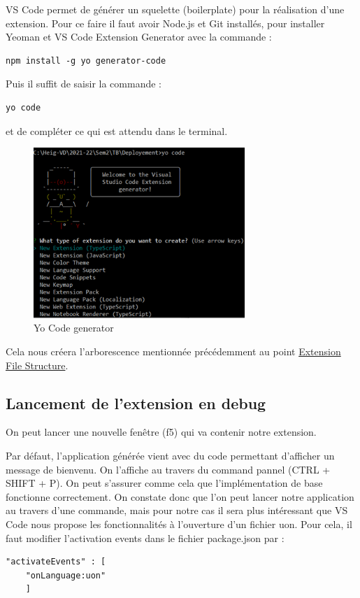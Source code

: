 \documentclass[
    iict, %
    il, %
]{heig-tb}
\begin{document}
VS Code permet de générer un squelette (boilerplate) pour la réalisation d'une extension. Pour ce faire il faut avoir Node.js et Git installés, pour installer Yeoman et VS Code Extension Generator avec la commande :


\begin{lstlisting}[frame=single,caption={generator-code},label={generator-code}]
npm install -g yo generator-code
\end{lstlisting}

Puis il suffit de saisir la commande :

\begin{lstlisting}[frame=single]
yo code
\end{lstlisting}

et de compléter ce qui est attendu dans le terminal.

\begin{figure}[!h]
    \begin{center}
        \includegraphics[width=8cm]{assets/figures/yo-code.png}
    \end{center}
    \caption[Yo Code generator]{\label{yo-code}Yo Code generator}
\end{figure}

Cela nous créera l'arborescence mentionnée précédemment au point \hyperref[Extension File Structure]{Extension File Structure}.

\subsection{Lancement de l'extension en debug}
On peut lancer une nouvelle fenêtre (f5) qui va contenir notre extension.

Par défaut, l'application générée vient avec du code permettant d'afficher un message de bienvenu. On l'affiche au travers du command pannel (CTRL + SHIFT + P). On peut s'assurer comme cela que l'implémentation de base fonctionne correctement.
On constate donc que l'on peut lancer notre application au travers d'une commande, mais pour notre cas il sera plus intéressant que VS Code nous propose les fonctionnalités à l'ouverture d'un fichier uon.
Pour cela, il faut modifier l'activation events dans le fichier package.json par :
\begin{lstlisting}[frame=single]
    "activateEvents" : [
	"onLanguage:uon"
    ]
\end{lstlisting}
\end{document}
